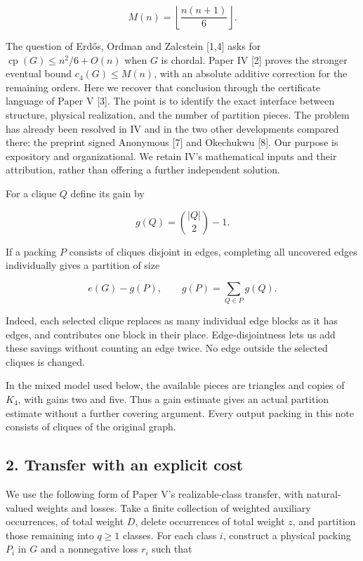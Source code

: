 \documentclass[english,11pt,a4paper]{article}
\begin{document}
\[
M(n)=\left\lfloor\frac{n(n+1)}6\right\rfloor.
\tag{1.1}
\]

The question of Erdős, Ordman and Zalcstein {[}1,4{]} asks for
\(\operatorname{cp}(G)\le n^2/6+O(n)\) when \(G\) is chordal. Paper IV
{[}2{]} proves the stronger eventual bound \(c_4(G)\le M(n)\), with an
absolute additive correction for the remaining orders. Here we recover
that conclusion through the certificate language of Paper V {[}3{]}. The
point is to identify the exact interface between structure, physical
realization, and the number of partition pieces. The problem has already
been resolved in IV and in the two other developments compared there:
the preprint signed Anonymous {[}7{]} and Okechukwu {[}8{]}. Our purpose
is expository and organizational. We retain IV's mathematical inputs and
their attribution, rather than offering a further independent solution.

For a clique \(Q\) define its gain by

\[
g(Q)=\binom{|Q|}{2}-1.
\]

If a packing \(P\) consists of cliques disjoint in edges, completing all
uncovered edges individually gives a partition of size

\[
e(G)-g(P),\qquad g(P)=\sum_{Q\in P}g(Q).
\tag{1.2}
\]

Indeed, each selected clique replaces as many individual edge blocks as
it has edges, and contributes one block in their place.
Edge-disjointness lets us add these savings without counting an edge
twice. No edge outside the selected cliques is changed.

In the mixed model used below, the available pieces are triangles and
copies of \(K_4\), with gains two and five. Thus a gain estimate gives
an actual partition estimate without a further covering argument. Every
output packing in this note consists of cliques of the original graph.

\subsection{2. Transfer with an explicit
cost}\label{transfer-with-an-explicit-cost}

We use the following form of Paper V's realizable-class transfer, with
natural-valued weights and losses. Take a finite collection of weighted
auxiliary occurrences, of total weight \(D\), delete occurrences of
total weight \(z\), and partition those remaining into \(q\ge1\)
classes. For each class \(i\), construct a physical packing \(P_i\) in
\(G\) and a nonnegative loss \(r_i\) such that
\end{document}
